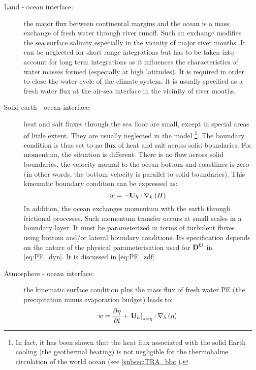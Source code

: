 \documentclass[../main/NEMO_manual]{subfiles}
\begin{document}
\begin{description}
\item[Land - ocean interface:]
  the major flux between continental margins and the ocean is a mass exchange of fresh water through river runoff.
  Such an exchange modifies the sea surface salinity especially in the vicinity of major river mouths.
  It can be neglected for short range integrations but has to be taken into account for long term integrations as
  it influences the characteristics of water masses formed (especially at high latitudes).
  It is required in order to close the water cycle of the climate system.
  It is usually specified as a fresh water flux at the air-sea interface in the vicinity of river mouths.
\item[Solid earth - ocean interface:]
  heat and salt fluxes through the sea floor are small, except in special areas of little extent.
  They are usually neglected in the model
  \footnote{
    In fact, it has been shown that the heat flux associated with the solid Earth cooling
    (\ie the geothermal heating) is not negligible for the thermohaline circulation of the world ocean
    (see \autoref{subsec:TRA_bbc}).
  }.
  The boundary condition is thus set to no flux of heat and salt across solid boundaries.
  For momentum, the situation is different. There is no flow across solid boundaries,
  \ie the velocity normal to the ocean bottom and coastlines is zero (in other words,
  the bottom velocity is parallel to solid boundaries). This kinematic boundary condition
  can be expressed as:
  \begin{equation}
    \label{eq:PE_w_bbc}
    w = -{\rm {\bf U}}_h \cdot  \nabla _h \left( H \right)
  \end{equation}
  In addition, the ocean exchanges momentum with the earth through frictional processes.
  Such momentum transfer occurs at small scales in a boundary layer.
  It must be parameterized in terms of turbulent fluxes using bottom and/or lateral boundary conditions.
  Its specification depends on the nature of the physical parameterisation used for
  ${\rm {\bf D}}^{\rm {\bf U}}$ in \autoref{eq:PE_dyn}.
  It is discussed in \autoref{eq:PE_zdf}.%
\item[Atmosphere - ocean interface:]
  the kinematic surface condition plus the mass flux of fresh water PE (the precipitation minus evaporation budget)
  leads to:
  \[
    w = \frac{\partial \eta }{\partial t}
    + \left. {{\rm {\bf U}}_h } \right|_{z=\eta } \cdot  \nabla _h \left( \eta \right)
\]
\end{description}
\end{document}
